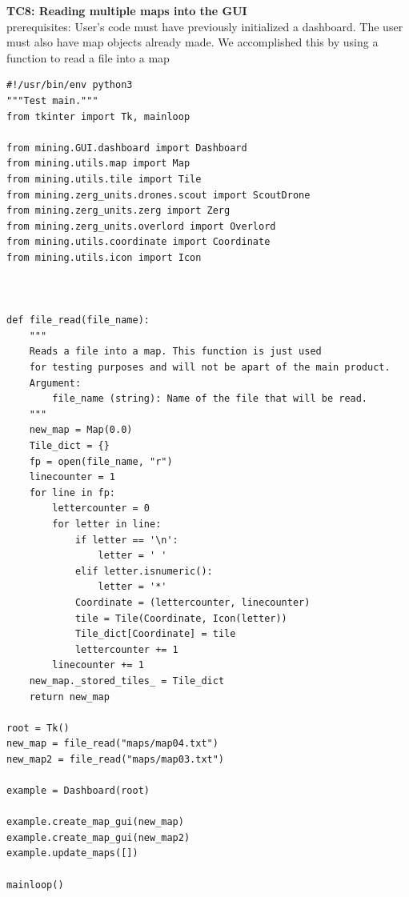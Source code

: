 \documentclass{article}
\begin{document}
\newpage
\Large\textbf{TC8: Reading  multiple maps into the GUI}\\
\indent\large{prerequisites: User's code must have previously initialized a dashboard. The user must also have map objects already made. We accomplished this by using a function to 
read a file into a map}\\
\begin{lstlisting}
#!/usr/bin/env python3
"""Test main."""
from tkinter import Tk, mainloop

from mining.GUI.dashboard import Dashboard
from mining.utils.map import Map
from mining.utils.tile import Tile
from mining.zerg_units.drones.scout import ScoutDrone
from mining.zerg_units.zerg import Zerg
from mining.zerg_units.overlord import Overlord
from mining.utils.coordinate import Coordinate
from mining.utils.icon import Icon



def file_read(file_name):
    """
    Reads a file into a map. This function is just used
    for testing purposes and will not be apart of the main product.
    Argument:
        file_name (string): Name of the file that will be read.
    """
    new_map = Map(0.0)
    Tile_dict = {}
    fp = open(file_name, "r")
    linecounter = 1
    for line in fp:
        lettercounter = 0 
        for letter in line:
            if letter == '\n':
                letter = ' '
            elif letter.isnumeric():
                letter = '*'
            Coordinate = (lettercounter, linecounter)
            tile = Tile(Coordinate, Icon(letter))
            Tile_dict[Coordinate] = tile
            lettercounter += 1
        linecounter += 1
    new_map._stored_tiles_ = Tile_dict
    return new_map

root = Tk()
new_map = file_read("maps/map04.txt")
new_map2 = file_read("maps/map03.txt")

example = Dashboard(root)

example.create_map_gui(new_map)
example.create_map_gui(new_map2)
example.update_maps([])

mainloop()

\end{lstlisting}
\end{document}
